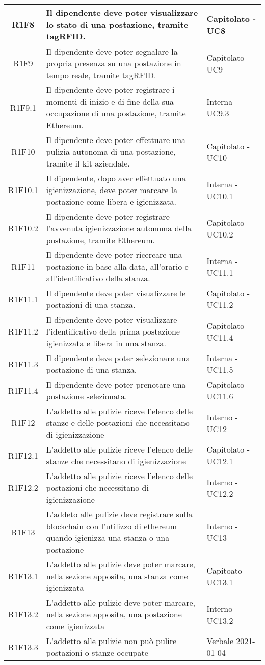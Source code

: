 \begin{center}
\begin{longtable}{|c|p{10cm}|p{4cm}|}
\hline
					R1F8&Il dipendente deve poter visualizzare lo stato di una postazione, tramite tagRFID.	&Capitolato - UC8 	\\
					\hline
			R1F9&Il dipendente deve poter segnalare la propria presenza su una postazione in tempo reale, tramite tagRFID.	&Capitolato - UC9 	\\
		\hline
		R1F9.1&Il dipendente deve poter registrare i momenti di inizio e di fine della sua occupazione di una postazione, tramite Ethereum.	&Interna - UC9.3 	\\
		\hline	
		R1F10&Il dipendente deve poter effettuare una pulizia autonoma di una postazione, tramite il kit aziendale.	&Capitolato - UC10	\\
		\hline		
		R1F10.1&Il dipendente, dopo aver effettuato una igienizzazione, deve poter marcare la postazione come libera e igienizzata.	&Interna - UC10.1	\\
		\hline	
		R1F10.2&Il dipendente deve poter registrare l'avvenuta igienizzazione autonoma della postazione, tramite Ethereum.	&Capitolato - UC10.2	\\
		\hline	
		R1F11&Il dipendente deve poter ricercare una postazione in base alla data, all'orario e all'identificativo della stanza.	&Interna - UC11.1	\\
		\hline
		R1F11.1&Il dipendente deve poter visualizzare le postazioni di una stanza.	&Capitolato - UC11.2	\\
		\hline
		R1F11.2&Il dipendente deve poter visualizzare l'identificativo della prima postazione igienizzata e libera in una stanza.	&Capitolato - UC11.4	\\
		\hline
		R1F11.3&Il dipendente deve poter selezionare una postazione di una stanza.	&Interna - UC11.5	\\
		\hline
		R1F11.4&Il dipendente deve poter prenotare una postazione selezionata.	&Capitolato - UC11.6	\\
		\hline
R1F12&L'addetto alle pulizie riceve l'elenco delle stanze e delle postazioni che necessitano di igienizzazione	& Interno - UC12	\\
						\hline
			R1F12.1&	L'addetto alle pulizie riceve l'elenco delle stanze che necessitano di igienizzazione& 	Capitolato - UC12.1\\
					\hline
			R1F12.2&L'addetto alle pulizie riceve l'elenco delle postazioni che necessitano di igienizzazione	& Interno - UC12.2	\\
					\hline
R1F13&L'addeto alle pulizie deve registrare sulla blockchain con l'utilizzo di ethereum quando igienizza una stanza o una postazione	& Interno - UC13	\\
					\hline
R1F13.1&L'addetto alle pulizie deve poter marcare, nella sezione apposita, una stanza come igienizzata	& Capitoato - UC13.1	\\
						\hline
			R1F13.2&L'addetto alle pulizie deve poter marcare, nella sezione apposita, una postazione come igienizzata	&Interno - UC13.2 	\\
					\hline
			R1F13.3&L'addetto alle pulizie non può pulire postazioni o stanze occupate	& Verbale 2021-01-04	\\
					\hline
						

\end{longtable}
\end{center}
